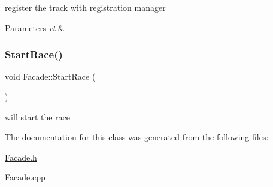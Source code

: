 register the track with registration manager 
\begin{DoxyParams}{Parameters}
{\em rt} & \\
\hline
\end{DoxyParams}
\mbox{\label{class_facade_a96d2f2e58be5d8a41cebcc23136ad3f9}} 
\subsubsection{\texorpdfstring{Start\+Race()}{StartRace()}}
{\footnotesize\ttfamily void Facade\+::\+Start\+Race (\begin{DoxyParamCaption}{ }\end{DoxyParamCaption})}

will start the race 

The documentation for this class was generated from the following files\+:\begin{DoxyCompactItemize}
\item 
\mbox{\hyperlink{_facade_8h}{Facade.\+h}}\item 
Facade.\+cpp\end{DoxyCompactItemize}
